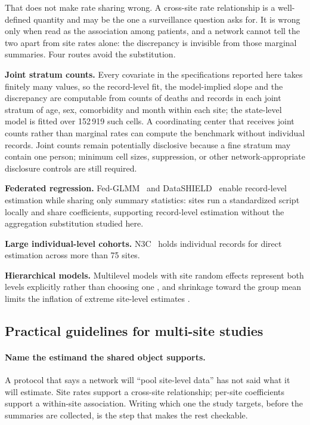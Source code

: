 \documentclass[11pt]{article}
\begin{document}
That does not make rate sharing wrong.  A cross-site rate relationship
is a well-defined quantity and may be the one a surveillance question
asks for.  It is wrong only when read as the association among patients,
and a network cannot tell the two apart from site rates alone: the
discrepancy is invisible from those marginal summaries.  Four
routes avoid the substitution.

\textbf{Joint stratum counts.}  Every covariate in the specifications
reported here takes finitely many values, so the record-level fit, the
model-implied slope and the discrepancy are computable from counts of
deaths and records in each joint stratum of age, sex, comorbidity and
month within each site; the state-level model is fitted over
152\,919 such cells.  A coordinating center that receives joint counts
rather than marginal rates can compute the benchmark without individual
records.  Joint counts remain potentially disclosive because a fine
stratum may contain one person; minimum cell sizes, suppression, or
other network-appropriate disclosure controls are still required.

\textbf{Federated regression.}
Fed-GLMM~\cite{yan2023fedglmm} and
DataSHIELD~\cite{banerjee2022dssurvival} enable record-level estimation
while sharing only summary statistics: sites run a standardized script
locally and share coefficients, supporting record-level estimation
without the aggregation substitution studied here.

\textbf{Large individual-level cohorts.}  N3C~\cite{haendel2021n3c} holds individual
records for direct estimation across more than 75 sites.

\textbf{Hierarchical models.}  Multilevel models with site random
effects represent both levels explicitly rather than choosing one
\cite{diezroux2000multilevel}, and shrinkage toward the group mean
limits the inflation of extreme site-level estimates
\cite{gelman2012multilevel}.

\subsection{Practical guidelines for multi-site studies}

\paragraph{Name the estimand the shared object supports.}
A protocol that says a network will ``pool site-level data'' has not
said what it will estimate.  Site rates support a cross-site
relationship; per-site coefficients support a within-site association.
Writing which one the study targets, before the summaries are
collected, is the step that makes the rest checkable.
\end{document}
